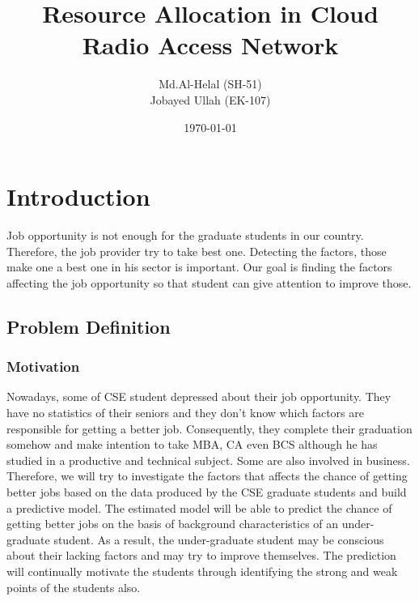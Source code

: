 \documentclass{article}
\begin{document}
\title{Resource Allocation in Cloud Radio Access Network}
\author{Md.Al-Helal (SH-51) \\ Jobayed Ullah (EK-107)} 
\date{\today}
\maketitle
\section{Introduction}
Job opportunity is not enough for the graduate students in our country. Therefore, the job provider try to take best one. Detecting the factors, those make one a best one in his sector is important. Our goal is finding the factors affecting the job opportunity  so that student can give attention to improve those.

\subsection{Problem Definition}
\subsubsection{Motivation}
Nowadays, some of CSE student depressed about their job opportunity. They have no statistics of their seniors and they don't know which factors are responsible for getting a better job. Consequently, they complete their graduation somehow and make intention to take MBA, CA even BCS although he has studied in a productive and technical subject. Some are also involved in business. Therefore, we will try to investigate the factors that affects the chance of getting better jobs based on the data produced by the CSE graduate students and build a predictive model. The estimated model will be able to predict the chance of getting better jobs on the basis of background characteristics of an under-graduate student. As a result, the   under-graduate student may be conscious about their lacking factors and may try to improve themselves.  The prediction will continually motivate the students through identifying the strong and weak points of the students also.
\end{document}
